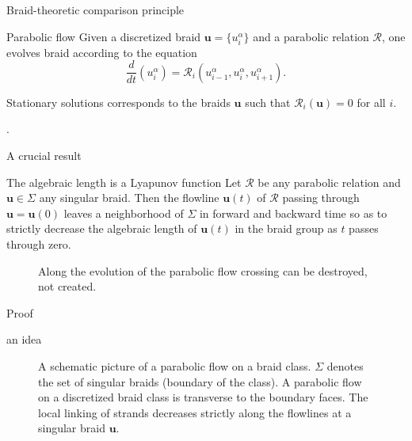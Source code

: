\documentclass[9pt, english]{beamer}
\theoremstyle{definition}
\newcommand{\simbolovettore}[1]{{\boldsymbol{#1}}}
\newcommand{\vu}{\simbolovettore{u}}
\begin{document}
\begin{frame}{Braid-theoretic comparison principle}
    \begin{block}{Parabolic flow}\pause
    Given a discretized braid $\vu=\{u_i^\alpha\}$ and a parabolic
    relation $\mathscr R$, one evolves braid according to the
    equation
    \[
    \dfrac{d}{dt}(u_i^\alpha)= \mathscr R_i(u_{i-1}^\alpha, u_i^\alpha,
    u_{i+1}^\alpha).
    \]
    \end{block}\pause
    \begin{block}{Stationary solutions}\pause
    corresponds to the braids $\vu$ such that $\mathscr R_i(\vu)=0$
    for all $i$. \pause

    {\color{blue}{The parabolic relation $\mathscr R$ induces a flow on $\mathscr D_d^n$ which
    respects a braid-theoretic comparison principle}.\/}
    \end{block}
\end{frame}
\begin{frame}{A crucial result}\pause
    \begin{block}{The algebraic length is a Lyapunov function}
        Let $\mathscr R$ be any parabolic relation and $\vu \in \Sigma$
        any singular braid. Then the flowline $\vu(t)$ of $\mathscr R$
        passing through $\vu=\vu(0)$ leaves  a neighborhood of $\Sigma$
        in forward and backward time so as to strictly decrease the
        algebraic length of $\vu(t)$ in the braid group as $t$ passes
        through zero.
    \end{block}
        \begin{figure}\label{fig:crossing}
        \caption{Along the evolution of the parabolic flow crossing can be
        destroyed, not created.}
        \end{figure}
\end{frame}
\begin{frame}{Proof}
    \begin{block}{an idea}
    \begin{figure}\label{fig:idea}
        \caption{A schematic picture of a parabolic flow on
        a braid class. $\Sigma$ denotes the set of singular braids (boundary of the class). A parabolic flow on a discretized
        braid class is transverse to the boundary faces. The local linking of strands decreases strictly along the
        flowlines at a singular braid $\vu$.}
        \end{figure}
    \end{block}
\end{frame}
\end{document}

